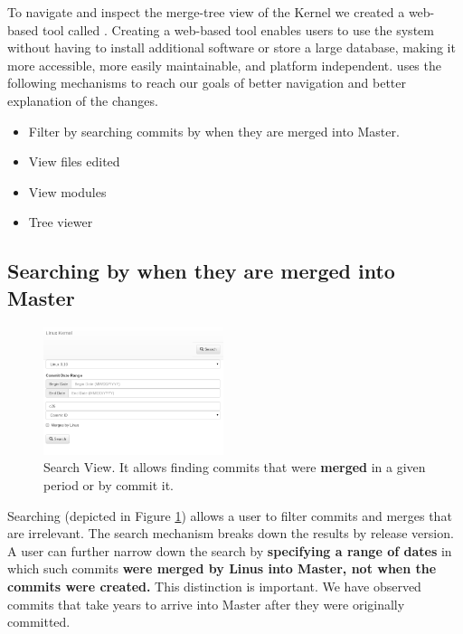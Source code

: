 \documentclass[conference, draftclsnofoot, draft]{IEEEtran}
\begin{document}

To navigate and inspect the merge-tree view of the Kernel we
created a web-based tool called \tool. Creating a web-based
tool enables users to use the system without having to install additional software
or store a large database, making it more accessible, more easily maintainable, and
platform independent. 
\tool uses the following mechanisms to reach our goals of better navigation and
better explanation of the changes.

\begin{itemize}
        \item Filter by searching commits by when they are merged into Master.
        \item View files edited
        \item View modules
        \item Tree viewer
\end{itemize}


\subsection{Searching by when they are merged into Master}


\begin{figure}
        \centering
        \includegraphics[width=0.47\textwidth]{figures/search.png}
        \caption{Search View. It allows finding commits that were \textbf{merged} in a given period or by commit it.}
        \label{fig:search}
\end{figure}

Searching (depicted in Figure \ref{fig:search}) allows a user to filter commits and merges that are irrelevant. The search mechanism breaks down the results by
release version.  A user can further narrow down the search by \textbf{specifying a range of dates} in which such commits \textbf{were merged by Linus into
  Master, not
  when the commits were created.} This distinction is important. We have observed commits that take years
to arrive into Master after they were originally committed. 
\end{document}
